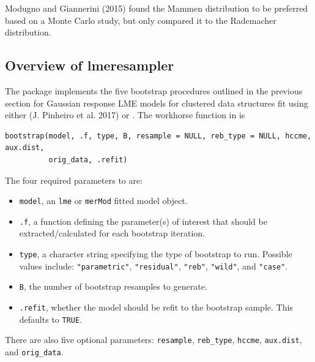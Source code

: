 Modugno and Giannerini (2015) found the Mammen distribution to be preferred based on a Monte Carlo study, but only compared it to the Rademacher distribution.

\hypertarget{overview-of-lmeresampler}{%
\subsection{Overview of lmeresampler}\label{overview-of-lmeresampler}}

The  package implements the five bootstrap procedures outlined in the previous section for Gaussian response
LME models for clustered data structures fit using either  (J. Pinheiro et al. 2017) or . The workhorse function in  is

\begin{verbatim}
bootstrap(model, .f, type, B, resample = NULL, reb_type = NULL, hccme, aux.dist,
          orig_data, .refit)
\end{verbatim}

\noindent The four required parameters to  are:

\begin{itemize}
\item
  \texttt{model}, an \texttt{lme} or \texttt{merMod} fitted model object.
\item
  \texttt{.f}, a function defining the parameter(s) of interest that should be extracted/calculated for each bootstrap iteration.
\item
  \texttt{type}, a character string specifying the type of bootstrap to run. Possible values include: \texttt{"parametric"}, \texttt{"residual"}, \texttt{"reb"}, \texttt{"wild"}, and \texttt{"case"}.
\item
  \texttt{B}, the number of bootstrap resamples to generate.
\item
  \texttt{.refit}, whether the model should be refit to the bootstrap sample. This defaults to \texttt{TRUE}.
\end{itemize}

There are also five optional parameters: \texttt{resample}, \texttt{reb\_type}, \texttt{hccme}, \texttt{aux.dist}, and \texttt{orig\_data}.

